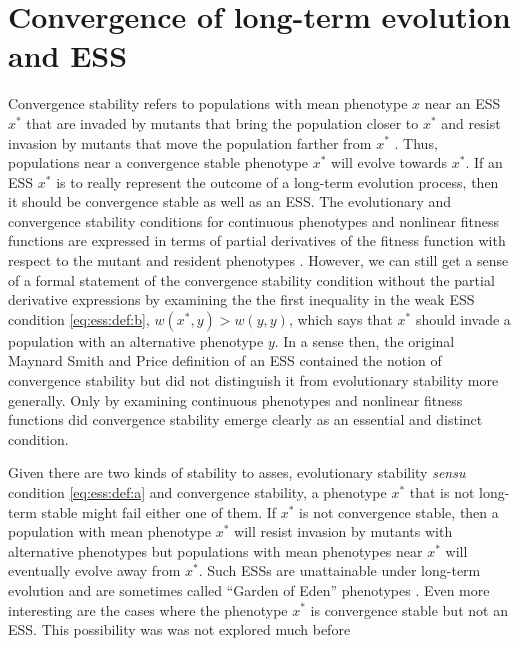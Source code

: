 \documentclass[11pt]{article}
\newcommand{\w}{w}
\newcommand{\ess}[1]{#1^*}
\begin{document}
\section{Convergence of long-term evolution and ESS}

Convergence stability refers to populations with mean phenotype $x$ near an ESS $\ess{x}$ that are invaded by mutants that bring the population closer to $\ess{x}$ and resist invasion by mutants that move the population farther from $\ess{x}$ \cite{Eshel:1983,Taylor:1989}. Thus, populations near a convergence stable phenotype $\ess{x}$ will evolve towards $\ess{x}$. If an ESS $\ess{x}$ is to really represent the outcome of a long-term evolution process, then it should be convergence stable as well as an ESS. The evolutionary and convergence stability conditions for continuous phenotypes and nonlinear fitness functions are expressed in terms of partial derivatives of the fitness function with respect to the mutant and resident phenotypes \cite{Eshel:1983,Taylor:1989,Geritz:Kisdi:1998}. However, we can still get a sense of a formal statement of the convergence stability condition without the partial derivative expressions by examining the the first inequality in the weak ESS condition \eqref{eq:ess:def:b}, $\w(\ess{x}, y) > \w(y, y)$, which says that $\ess{x}$ should invade a population with an alternative phenotype $y$. In a sense then, the original Maynard Smith and Price definition of an ESS \cite{Maynard-Smith:Price:1973,Maynard-Smith:1974} contained the notion of convergence stability but did not distinguish it from evolutionary stability more generally. Only by examining continuous phenotypes and nonlinear fitness functions did convergence stability emerge clearly as an essential and distinct condition.

Given there are two kinds of stability to asses, evolutionary stability \textit{sensu} condition \eqref{eq:ess:def:a} and convergence stability, a phenotype $\ess{x}$ that is not long-term stable might fail either one of them. If $\ess{x}$ is not convergence stable, then a population with mean phenotype $\ess{x}$ will resist invasion by mutants with alternative phenotypes but populations with mean phenotypes near $\ess{x}$ will eventually evolve away from $\ess{x}$. Such ESSs are unattainable under long-term evolution and are sometimes called ``Garden of Eden'' phenotypes \cite{Hofbauer:Sigmund:1990}. Even more interesting are the cases where the phenotype $\ess{x}$ is convergence stable but not an ESS. This possibility was was not explored much before
\end{document}
